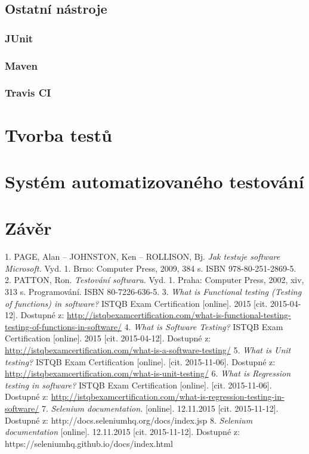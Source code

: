 \documentclass[
    color,   %
	table,   %
    twoside, %
]{fithesis3}
\begin{document}
  \section{Ostatní nástroje}
   \subsection{JUnit}
  \subsection{Maven}
   \subsection{Travis CI}
  \chapter{Tvorba testů}
  \chapter{Systém automatizovaného testování}
  \chapter{Závěr}
  
  \renewcommand{\refname}{Seznam literatury}
  \begin{thebibliography}{9}
  1. PAGE, Alan – JOHNSTON, Ken – ROLLISON, Bj. \emph{Jak testuje software Microsoft.} Vyd. 1. Brno: Computer Press, 2009, 384 s. ISBN 978-80-251-2869-5.
  2. PATTON, Ron. \emph{Testování softwaru.} Vyd. 1. Praha: Computer Press, 2002, xiv, 313 s. Programování. ISBN 80-7226-636-5. 
  3. \emph{What is Functional testing (Testing of functions) in software?} ISTQB Exam Certification [online]. 2015 [cit. 2015-04-12]. Dostupné z: \url{http://istqbexamcertification.com/what-is-functional-testing-testing-of-functions-in-software/}
  4. \emph{What is Software Testing?} ISTQB Exam Certification [online]. 2015 [cit. 2015-04-12]. Dostupné z: \url{http://istqbexamcertification.com/what-is-a-software-testing/}
  5. \emph{What is Unit testing?} ISTQB Exam Certification [online]. [cit. 2015-11-06]. Dostupné z: \url{http://istqbexamcertification.com/what-is-unit-testing/}
  6. \emph{What is Regression testing in software?} ISTQB Exam Certification [online]. [cit. 2015-11-06]. Dostupné z: \url{http://istqbexamcertification.com/what-is-regression-testing-in-software/}
  7. \emph{Selenium documentation.} [online]. 12.11.2015 [cit. 2015-11-12]. Dostupné z: http://docs.seleniumhq.org/docs/index.jsp
  8. \emph{Selenium documentation} [online]. 12.11.2015 [cit. 2015-11-12]. Dostupné z: https://seleniumhq.github.io/docs/index.html
  \end{thebibliography}
\end{document}
